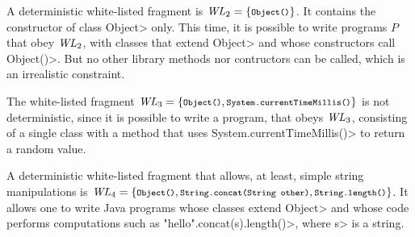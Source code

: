 A deterministic white-listed fragment is $\wl_2=\{\<Object()>\}$. It contains
the constructor of class \<Object> only. This time, it is possible to write programs $P$
that obey $\mathit{WL}_2$, with classes that extend \<Object> and whose constructors call \<Object()>.
But no other library methods nor contructors can be called, which is an irrealistic constraint.

The white-listed fragment $\wl_3=\{\<Object()>,\<System.currentTimeMillis()>\}$ is not deterministic,
since it is possible to write a program, that obeys $\mathit{WL}_3$, consisting of a single class
with a method that uses \<System.currentTimeMillis()> to return a random value.

A deterministic white-listed fragment that allows, at least, simple string manipulations is
$\wl_4=\{\<Object()>,\<String.concat(String other)>,\<String.length()>\}$. It allows one
to write Java programs whose classes extend \<Object> and whose code performs computations
such as \<"hello".concat(s).length()>, where \<s> is a string.

